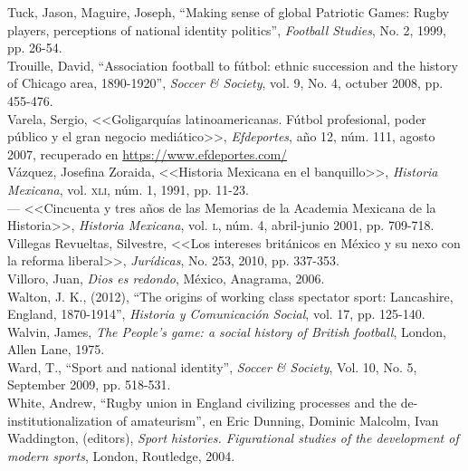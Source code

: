 \documentclass[11pt,a5paper,twoside]{book} %
\begin{document}
\begin{hangparas}{1cm}{1}
\pagebreak

\noindent Tuck, Jason, Maguire, Joseph, “Making sense of global Patriotic Games: Rugby players, perceptions of national identity politics”, \emph{Football Studies}, No. 2, 1999, pp. 26-54. \\

\noindent Trouille, David, “Association football to fútbol: ethnic succession and the history of Chicago area, 1890-1920”, \emph{Soccer \& Society}, vol. 9, No. 4, octuber 2008, pp. 455-476. \\

\noindent Varela, Sergio, <<Goligarquías latinoamericanas. Fútbol profesional, poder público y el gran negocio mediático>>, \emph{Efdeportes}, año 12, núm. 111, agosto 2007, recuperado en \url{https://www.efdeportes.com/} \\

\noindent Vázquez, Josefina Zoraida, <<Historia Mexicana en el banquillo>>, \emph{Historia Mexicana}, vol. \textsc{xli}, núm. 1, 1991, pp. 11-23. \\

\noindent --- <<Cincuenta y tres años de las Memorias de la Academia Mexicana de la Historia>>, \emph{Historia Mexicana}, vol. \textsc{l}, núm. 4, abril-junio 2001, pp. 709-718. \\

\noindent Villegas Revueltas, Silvestre, <<Los intereses británicos en México y su nexo con la reforma
liberal>>, \emph{Jurídicas}, No. 253, 2010, pp. 337-353. \\

\noindent Villoro, Juan, \emph{Dios es redondo}, México, Anagrama, 2006. \\

\noindent Walton, J. K., (2012), “The origins of working class spectator sport: Lancashire, England, 1870-1914”, \emph{Historia y Comunicación Social}, vol. 17, pp. 125-140. \\

\noindent Walvin, James, \emph{The People's game: a social history of British football}, London, Allen Lane, 1975. \\

\noindent Ward, T., “Sport and national identity”, \emph{Soccer \& Society}, Vol. 10, No. 5, September 2009, pp. 518-531. \\

\noindent White, Andrew, “Rugby union in England civilizing processes and the de-institutionalization
of amateurism”, en Eric Dunning, Dominic Malcolm, Ivan Waddington, (editors), \emph{Sport histories. Figurational studies of the development of modern sports}, London, Routledge, 2004. \\


\end{hangparas}
\end{document}
